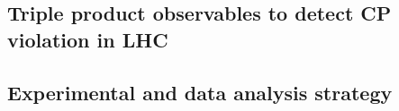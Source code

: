 






	\subsection{Triple product observables to detect CP violation in LHC}
	\label{ssec:Intro_TPinLHC}


	\subsection{Experimental and data analysis strategy}
	\label{ssec:Intro_ExpDAStr}

\FloatBarrier
